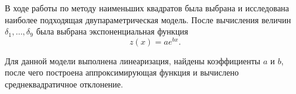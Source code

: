В ходе работы по методу наименьших квадратов была выбрана и исследована
наиболее подходящая двупараметрическая модель. После вычисления величин
$\delta_1,\dots,\delta_9$ была выбрана экспоненциальная функция
\[
z(x)=ae^{bx}.
\]

Для данной модели выполнена линеаризация, найдены коэффициенты $a$ и $b$,
после чего построена аппроксимирующая функция и вычислено
среднеквадратичное отклонение.
